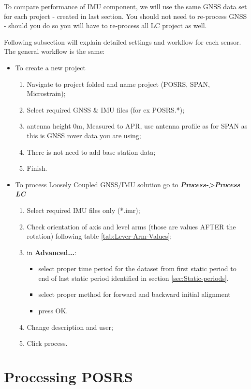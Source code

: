 \documentclass[11pt,fleqn]{book} %
\begin{document}
To compare performance of IMU component, we will use the same GNSS data set for each project - created in last section. You should not need to re-process GNSS - should you do so you will have to re-process all LC project as well.  

Following subsection will explain detailed settings and workflow for each sensor. The general workflow is the same:
\medskip
\begin{itemize}
	\item To create a new project 
	\begin{enumerate}
		\item Navigate to project folded and name project (POSRS, SPAN, Microstrain);
		\item Select required GNSS \& IMU files (for ex POSRS.{*});
		\item antenna height 0m, Measured to APR, use antenna profile as for SPAN as this is GNSS rover data you are using;
		\item There is not need to add base station data;
		\item Finish.
	\end{enumerate}
	\item To process Loosely Coupled GNSS/IMU solution go to \textbf{\emph{Process->Process LC}}
		\begin{enumerate}
			\item Select required IMU files only ({*}.imr);
			\item Check orientation of axis and level arms (those are values AFTER the rotation) following table \ref{tab:Lever-Arm-Values};
			\item in \textbf{Advanced...}:
			\begin{itemize}
			 	\item select proper time period for the dataset from first static period to end of last static period identified in section \ref{sec:Static-periods}.
			 	\item select proper method for forward and backward initial alignment
			 	\item press OK.
			 \end{itemize} 
			\item Change description and user;
			\item Click process.
		\end{enumerate}
\end{itemize}



\section{Processing POSRS\label{sub:Processing-POSRS}}
\end{document}
